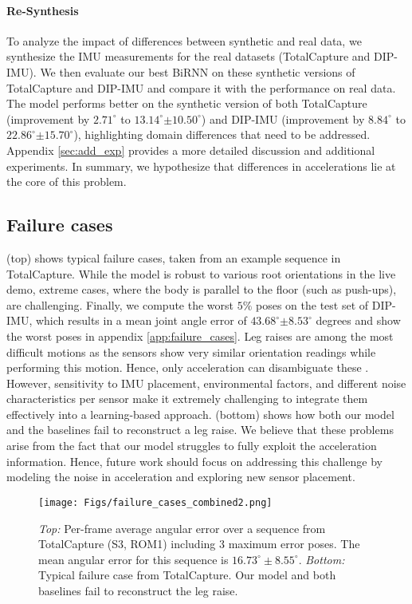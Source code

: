 \documentclass[acmtog]{acmart}
\begin{document}
\paragraph*{Re-Synthesis}
To analyze the impact of differences between synthetic and real data, we synthesize the IMU measurements for the real datasets (TotalCapture and DIP-IMU). We then evaluate our best BiRNN on these synthetic versions of TotalCapture and DIP-IMU and compare it with the performance on real data. The model performs better on the synthetic version of both TotalCapture (improvement by $2.71^\circ$ to $13.14^\circ$$\pm 10.50^\circ$) and DIP-IMU (improvement by $8.84^\circ$ to $22.86^\circ$$\pm 15.70^\circ$), highlighting domain differences that need to be addressed. Appendix \ref{sec:add_exp} provides a more detailed discussion and additional experiments. In summary, we hypothesize that differences in accelerations lie at the core of this problem.

\subsection{Failure cases}\label{sec:failure_cases} (top) shows typical failure cases, taken from an example sequence in TotalCapture. While the model is robust to various root orientations in the live demo, extreme cases, where the body is parallel to the floor (such as push-ups), are challenging. Finally, we compute the worst $5\%$ poses on the test set of DIP-IMU, which results in a mean joint angle error of $43.68^\circ$$\pm 8.53^\circ$ degrees and show the worst poses in appendix \ref{app:failure_cases}. Leg raises are among the most difficult motions as the sensors show very similar orientation readings while performing this motion. Hence, only acceleration can disambiguate these \cite{von2017sparse}. However, sensitivity to IMU placement, environmental factors, and different noise characteristics per sensor make it extremely challenging to integrate them effectively into a learning-based approach.  (bottom) shows how both our model and the baselines fail to reconstruct a leg raise. We believe that these problems arise from the fact that our model struggles to fully exploit the acceleration information. Hence, future work should focus on addressing this challenge by modeling the noise in acceleration and exploring new sensor placement.

\begin{figure}
\centering
\texttt{[image: Figs/failure\_cases\_combined2.png]}
\caption{\emph{Top:} Per-frame average angular error over a sequence from TotalCapture (S3, ROM1) including 3 maximum error poses. The mean angular error for this sequence is $16.73^\circ \pm 8.55^\circ$. \emph{Bottom:} Typical failure case from TotalCapture. Our model and both baselines fail to reconstruct the leg raise.}
\label{fig:failure_cases}
\end{figure}
\end{document}
